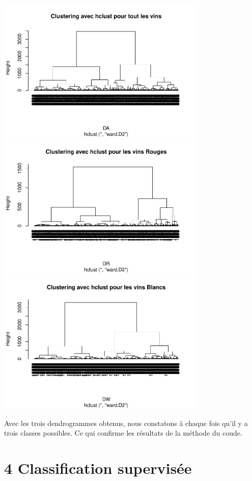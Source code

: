 \documentclass[
]{article}
\begin{document}
\begin{center}
	\includegraphics[width=10cm]{repport_files/figure-latex/unnamed-chunk-15-1.pdf}
\includegraphics[width=10cm]{repport_files/figure-latex/unnamed-chunk-15-2.pdf}
\includegraphics[width=10cm]{repport_files/figure-latex/unnamed-chunk-15-3.pdf} 
\end{center}Avec
les trois dendrogrammes obtenus, nous constatons à chaque fois qu'il y a
trois classes possibles. Ce qui confirme les résultats de la méthode du
coude.
\newpage
\hypertarget{classification-supervisuxe9e}{%
\section{4 Classification
supervisée}\label{classification-supervisuxe9e}}
\end{document}
